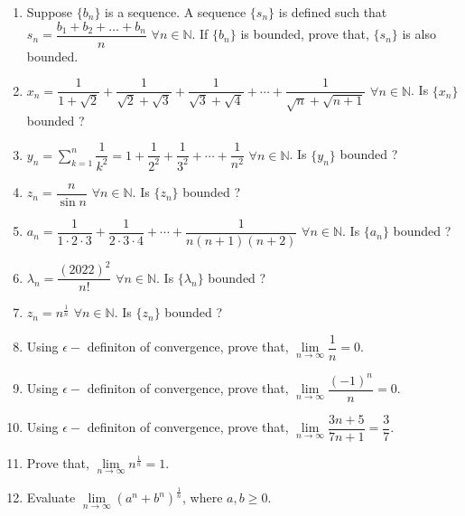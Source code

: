 \documentclass[11pt, a4paper]{article}
\begin{document}
\begin{enumerate}

	\item Suppose $\{b_n\}$ is a sequence. A sequence $\{s_n\}$ is defined such that $s_n = \dfrac{b_1 + b_2 + \ldots + b_n}{n}$ $\forall n \in \mathbb{N}$. If $\{b_n\}$ is bounded, prove that, $\{s_n\}$ is also bounded.
	
	\item $x_n = \dfrac{1}{1+\sqrt{2}} + \dfrac{1}{\sqrt{2} + \sqrt{3}} + \dfrac{1}{\sqrt{3} + \sqrt{4}} + \cdots + \dfrac{1}{\sqrt{n} + \sqrt{n+1}}$  $\forall n \in \mathbb{N}$. Is $\{x_n\}$ bounded ?
	
	\item $y_n = \sum \limits_{k = 1}^{n} \dfrac{1}{k^2} = 1 + \dfrac{1}{2^2} + \dfrac{1}{3^2} + \cdots + \dfrac{1}{n^2}$  $\forall n \in \mathbb{N}$. Is $\{y_n\}$ bounded ?
	
	\item $z_n = \dfrac{n}{\sin n}$   $\forall n \in \mathbb{N}$. Is $\{z_n\}$ bounded ?
	
	\item $a_n = \dfrac{1}{1\cdot 2\cdot 3} + \dfrac{1}{2\cdot 3\cdot 4} + \cdots + \dfrac{1}{n(n+1)(n+2)}$   $\forall n \in \mathbb{N}$. Is $\{a_n\}$ bounded ?
	
	\item $\lambda_n = \dfrac{(2022)^2}{n!}$  $\forall n \in \mathbb{N}$. Is $\{\lambda_n\}$ bounded ?
	
	\item $z_n = n^{\frac{1}{n}}$ $\forall n \in \mathbb{N}$. Is $\{z_n\}$ bounded ?
	
	\item Using $\epsilon-$ definiton of convergence, prove that, $\lim \limits_{n \rightarrow \infty} \dfrac{1}{n} = 0$.
	
	\item Using $\epsilon-$ definiton of convergence, prove that, $\lim \limits_{n \rightarrow \infty} \dfrac{(-1)^n}{n} = 0$.
	
	\item Using $\epsilon-$ definiton of convergence, prove that, $\lim \limits_{n \rightarrow \infty} \dfrac{3n+5}{7n+1} = \dfrac{3}{7}$.
	
	\item Prove that, $\lim \limits_{n \rightarrow \infty} n^{\frac{1}{n}} = 1$.
	
	\item Evaluate $\lim \limits_{n \rightarrow \infty} \left( a^n + b^n \right)^{\frac{1}{n}}$, where $a, b \geq 0$.
	

\end{enumerate}
\end{document}
